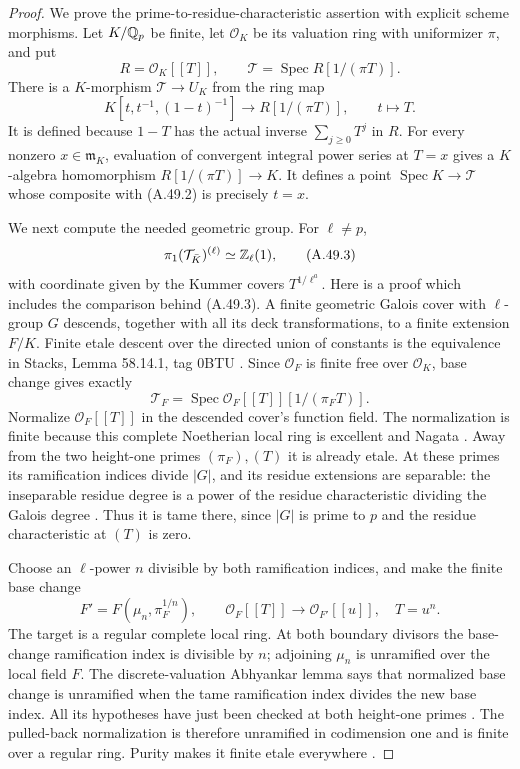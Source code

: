 \begin{proof}
We prove the prime-to-residue-characteristic assertion with
explicit scheme morphisms.  Let $K/\mathbb Q_p$ be finite, let
$\mathcal O_K$ be its valuation ring with uniformizer $\pi$, and
put
\[
 R=\mathcal O_K[[T]],\qquad
 \mathcal T=\operatorname{Spec}R[1/(\pi T)].
\tag{A.49.1}
\]
There is a $K$-morphism $\mathcal T\to U_K$ from the ring map
\[
 K[t,t^{-1},(1-t)^{-1}]\longrightarrow R[1/(\pi T)],
                       \qquad t\longmapsto T.
\tag{A.49.2}
\]
It is defined because $1-T$ has the actual inverse
$\sum_{j\ge0}T^j$ in $R$.  For every nonzero
$x\in\mathfrak m_K$, evaluation of convergent integral power
series at $T=x$ gives a $K$-algebra homomorphism
$R[1/(\pi T)]\to K$.  It defines a point
$\operatorname{Spec}K\to\mathcal T$ whose composite with
(A.49.2) is precisely $t=x$.

We next compute the needed geometric group.  For $\ell\ne p$,
\[
              \pi_1(\mathcal T_{\bar K})^{(\ell)}
                           \simeq\mathbb Z_\ell(1),
\tag{A.49.3}
\]
with coordinate given by the Kummer covers $T^{1/\ell^a}$.
Here is a proof which includes the comparison behind (A.49.3).
A finite geometric Galois cover with $\ell$-group $G$ descends,
together with all its deck transformations, to a finite extension
$F/K$.  Finite etale descent over the directed union of constants
is the equivalence in Stacks, Lemma 58.14.1, tag 0BTU
\cite{LegStacksFields2026}.  Since $\mathcal O_F$ is finite free
over $\mathcal O_K$, base change gives exactly
\[
           \mathcal T_F=
           \operatorname{Spec}\mathcal O_F[[T]][1/(\pi_FT)].
\]
Normalize $\mathcal O_F[[T]]$ in the descended cover's function
field.  The normalization is finite because this complete
Noetherian local ring is excellent and Nagata
\cite[tag 07QW]{LegStacksExcellent2026}.  Away from the two
height-one primes $(\pi_F),(T)$ it is already etale.  At these
primes its ramification indices divide $|G|$, and its residue
extensions are separable: the inseparable residue degree is a
power of the residue characteristic dividing the Galois degree
\cite[tag 09EB]{LegStacksRamification2026}.  Thus it is tame
there, since $|G|$ is prime to $p$ and the residue characteristic
at $(T)$ is zero.

Choose an $\ell$-power $n$ divisible by both ramification indices,
and make the finite base change
\[
 F'=F(\mu_n,\pi_F^{1/n}),\qquad
 \mathcal O_F[[T]]\longrightarrow\mathcal O_{F'}[[u]],
                         \quad T=u^n.
\tag{A.49.4}
\]
The target is a regular complete local ring.  At both boundary
divisors the base-change ramification index is divisible by $n$;
adjoining $\mu_n$ is unramified over the local field $F$.
The discrete-valuation Abhyankar lemma says that normalized base
change is unramified when the tame ramification index divides
the new base index.  All its hypotheses have just been checked
at both height-one primes
\cite[Lemma 15.116.4, tag 0BRM]{LegStacksAbhyankar2026}.
The pulled-back normalization is therefore unramified in
codimension one and is finite over a regular ring.  Purity makes
it finite etale everywhere
\cite[Lemma 58.21.4, tag 0BMB]{LegStacksPurity2026}.


\end{proof}
